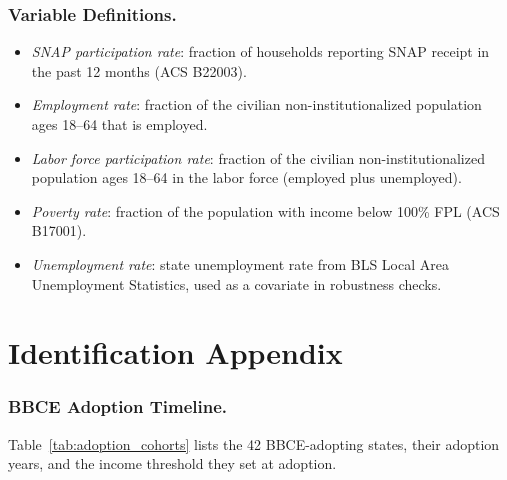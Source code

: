 \documentclass[12pt]{article}
\begin{document}
\subsubsection*{Variable Definitions.}
\begin{itemize}
    \item \textit{SNAP participation rate}: fraction of households reporting SNAP receipt in the past 12 months (ACS B22003).
    \item \textit{Employment rate}: fraction of the civilian non-institutionalized population ages 18--64 that is employed.
    \item \textit{Labor force participation rate}: fraction of the civilian non-institutionalized population ages 18--64 in the labor force (employed plus unemployed).
    \item \textit{Poverty rate}: fraction of the population with income below 100\% FPL (ACS B17001).
    \item \textit{Unemployment rate}: state unemployment rate from BLS Local Area Unemployment Statistics, used as a covariate in robustness checks.
\end{itemize}

\section{Identification Appendix}
\label{sec:id_appendix}

\subsubsection*{BBCE Adoption Timeline.} Table~\ref{tab:adoption_cohorts} lists the 42 BBCE-adopting states, their adoption years, and the income threshold they set at adoption.
\end{document}
